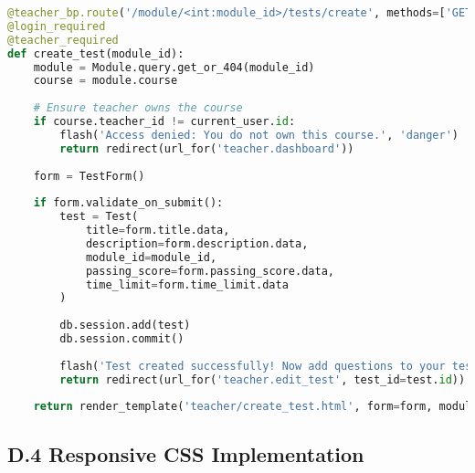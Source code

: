 \begin{lstlisting}[language=Python, caption=Test Creation and Question Management]
@teacher_bp.route('/module/<int:module_id>/tests/create', methods=['GET', 'POST'])
@login_required
@teacher_required
def create_test(module_id):
    module = Module.query.get_or_404(module_id)
    course = module.course
    
    # Ensure teacher owns the course
    if course.teacher_id != current_user.id:
        flash('Access denied: You do not own this course.', 'danger')
        return redirect(url_for('teacher.dashboard'))
    
    form = TestForm()
    
    if form.validate_on_submit():
        test = Test(
            title=form.title.data,
            description=form.description.data,
            module_id=module_id,
            passing_score=form.passing_score.data,
            time_limit=form.time_limit.data
        )
        
        db.session.add(test)
        db.session.commit()
        
        flash('Test created successfully! Now add questions to your test.', 'success')
        return redirect(url_for('teacher.edit_test', test_id=test.id))
    
    return render_template('teacher/create_test.html', form=form, module=module, course=course)
\end{lstlisting}

\subsection*{D.4 Responsive CSS Implementation}


